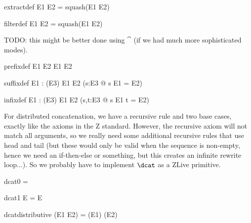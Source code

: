 \documentclass{article}
\begin{document}
\begin{zedrule}{extractdef}
   E1 \extract E2 = squash(E1 \dres E2)
\end{zedrule}

\begin{zedrule}{filterdef}
   E1 \filter E2 = squash(E1 \rres E2)
\end{zedrule}

TODO: this might be better done using $\cat$
(if we had much more sophisticated modes).
\begin{zedrule}{prefixdef}
   E1 \prefix E2 \iff E1 \subseteq E2
\end{zedrule}

\begin{zedrule}{suffixdef}
   \proviso E1 : \power (\arithmos \cross E3)
\derives
   E1 \suffix E2 \iff (\exists s:\seq E3 @ s \cat E1 = E2)
\end{zedrule}

\begin{zedrule}{infixdef}
   \proviso E1 : \power (\arithmos \cross E3)
\derives
   E1 \infix E2 \iff (\exists s,t:\seq E3 @ s \cat E1 \cat t = E2)
\end{zedrule}

For distributed concatenation, we have a recursive rule and
two base cases, exactly like the axioms in the Z standard.
However, the recursive axiom will not match all arguments,
so we really need some additional recursive rules that use 
head and tail (but these would only be valid when the sequence
is non-empty, hence we need an if-then-else or something, but this
creates an infinite rewrite loop...).  So we probably have to
implement $\dcat$ as a ZLive primitive. 
\begin{zedrule}{dcat0}
   \dcat \langle \rangle = \langle \rangle
\end{zedrule}
\begin{zedrule}{dcat1}
   \dcat \langle E \rangle = E
\end{zedrule}
\begin{zedrule}{dcatdistributive}
   \dcat (E1 \cat E2) = (\dcat E1) \cat (\dcat E2)
\end{zedrule}

\end{document}
